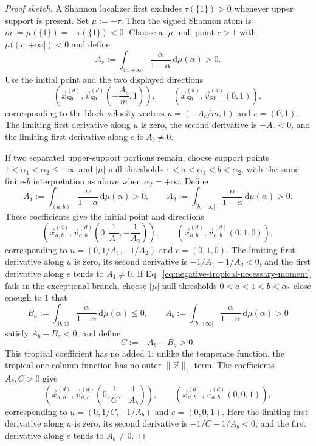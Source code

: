 \documentclass[aps,pra,11pt,onecolumn,nofootinbib,tightenlines]{revtex4-2}
\theoremstyle{definition}
\def \d {\mathrm{d}}
\begin{document}
\begin{proof}[Proof sketch]
A Shannon localizer first excludes $\tau(\{1\})>0$ whenever upper support is
present.  Set $\mu:=-\tau$.  Then the signed Shannon atom is
$m:=\mu(\{1\})=-\tau(\{1\})<0$.  Choose a $|\mu|$-null point $c>1$ with
$\mu((c,+\infty])<0$ and define
\[
A_c:=\int_{(c,+\infty]}
\frac{\alpha}{1-\alpha}\,\d\mu(\alpha)>0.
\]
Use the initial point and the two displayed directions
\begin{equation}
\left(
\vec{x}_{\mathrm{Sh}}^{(d)},
\vec{v}_{\mathrm{Sh}}^{(d)}\!\left(-\frac{A_c}{m},1\right)
\right),
\qquad
\left(
\vec{x}_{\mathrm{Sh}}^{(d)},
\vec{v}_{\mathrm{Sh}}^{(d)}(0,1)
\right),
\label{eq:tropical-Shannon-point-directions}
\end{equation}
corresponding to the block-velocity vectors
$u=(-A_c/m,1)$ and $e=(0,1)$.  The limiting first derivative along $u$ is
zero, the second derivative is $-A_c<0$, and the limiting first derivative
along $e$ is $A_c\neq0$.

If two separated upper-support portions remain, choose support points
$1<\alpha_1<\alpha_2\leq+\infty$ and $|\mu|$-null thresholds
$1<a<\alpha_1<b<\alpha_2$, with the same finite-$b$ interpretation as above
when $\alpha_2=+\infty$.  Define
\[
A_1:=\int_{(a,b)}\frac{\alpha}{1-\alpha}\,\d\mu(\alpha)>0,
\qquad
A_2:=\int_{(b,+\infty]}\frac{\alpha}{1-\alpha}\,\d\mu(\alpha)>0.
\]
These coefficients give the initial point and directions
\begin{equation}
\left(
\vec{x}_{a,b}^{(d)},
\vec{v}_{a,b}^{(d)}\!\left(0,\frac1{A_1},-\frac1{A_2}\right)
\right),
\qquad
\left(
\vec{x}_{a,b}^{(d)},
\vec{v}_{a,b}^{(d)}(0,1,0)
\right),
\label{eq:tropical-two-upper-point-directions}
\end{equation}
corresponding to
$u=(0,1/A_1,-1/A_2)$ and $e=(0,1,0)$.  The limiting first derivative along
$u$ is zero, its second derivative is $-1/A_1-1/A_2<0$, and the first
derivative along $e$ tends to $A_1\neq0$.  If
Eq.~\eqref{eq:negative-tropical-necessary-moment} fails in the exceptional
branch, choose $|\mu|$-null thresholds $0<a<1<b<\alpha_*$ close enough to
$1$ that
\[
B_a:=\int_{[0,a)}\frac{\alpha}{1-\alpha}\,\d\mu(\alpha)\leq0,
\qquad
A_b:=\int_{(b,+\infty]}\frac{\alpha}{1-\alpha}\,\d\mu(\alpha)>0
\]
satisfy $A_b+B_a<0$, and define
\[
C:=-A_b-B_a>0.
\]
This tropical coefficient has no added $1$: unlike the temperate function,
the tropical one-column function has no outer $\|\vec{x}\|_1$ term.  The
coefficients $A_b,C>0$ give
\begin{equation}
\left(
\vec{x}_{a,b}^{(d)},
\vec{v}_{a,b}^{(d)}\!\left(0,\frac1C,-\frac1{A_b}\right)
\right),
\qquad
\left(
\vec{x}_{a,b}^{(d)},
\vec{v}_{a,b}^{(d)}(0,0,1)
\right),
\label{eq:tropical-moment-point-directions}
\end{equation}
corresponding to $u=(0,1/C,-1/A_b)$ and $e=(0,0,1)$.  Here the limiting first
derivative along $u$ is zero, its second derivative is $-1/C-1/A_b<0$, and the
first derivative along $e$ tends to $A_b\neq0$.


\end{proof}
\end{document}
